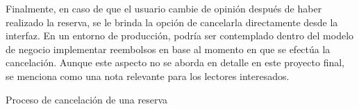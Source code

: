Finalmente, en caso de que el usuario cambie de opinión después de haber realizado la reserva, se le brinda la opción de cancelarla directamente desde la interfaz. En un entorno de producción, podría ser contemplado dentro del modelo de negocio implementar reembolsos en base al momento en que se efectúa la cancelación. Aunque este aspecto no se aborda en detalle en este proyecto final, se menciona como una nota relevante para los lectores interesados.

\begin{images}[\label{cancelacion_reserva}]{Proceso de cancelación de una reserva}
\end{images}
